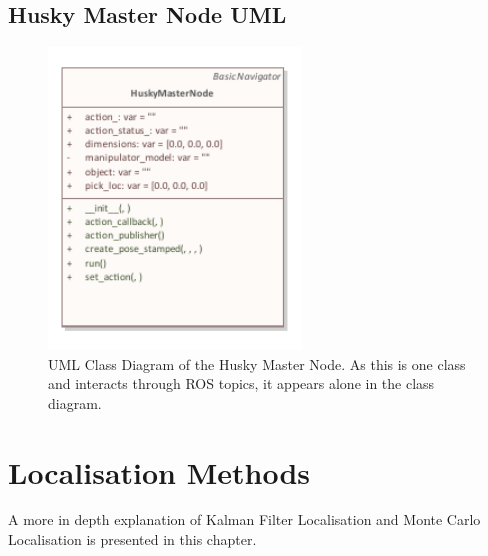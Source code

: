 \section{Husky Master Node UML}

\begin{figure}[H]
  \centering
  \includegraphics[width = 0.6\textwidth]{Figures/husky_master.pdf}
  \caption{UML Class Diagram of the Husky Master Node. As this is one class and interacts through ROS topics, it appears alone in the class diagram.}
  \label{A:fig:M:TL:huskyMasterUML}
\end{figure}

\chapter{Localisation Methods}
A more in depth explanation of Kalman Filter Localisation and Monte Carlo Localisation is presented in this chapter.
